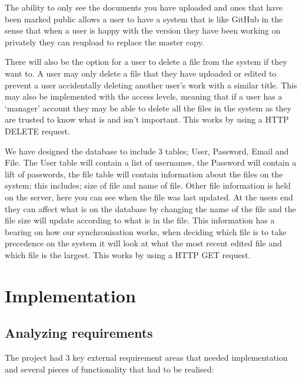 \documentclass[11pt]{article}
\begin{document}
The ability to only see the documents you have uploaded and ones that have been marked public allows a user to have a system that is like GitHub in the sense that when a user is happy with the version they have been working on privately they can reupload to replace the master copy. 

There will also be the option for a user to delete a file from the system if they want to. A user may only delete a file that they have uploaded or edited to prevent a user accidentally deleting another user’s work with a similar title. This may also be implemented with the access levels, meaning that if a user has a ‘manager’ account they may be able to delete all the files in the system as they are trusted to know what is and isn’t important. This works by using a HTTP DELETE request.

We have designed the database to include 3 tables; User, Password, Email and File. The User table will contain a list of usernames, the Password will contain a lift of passwords, the file table will contain information about the files on the system; this includes; size of file and name of file. Other file information is held on the server, here you can see when the file was last updated. At the users end they can affect what is on the database by changing the name of the file and the file size will update according to what is in the file. This information has a bearing on how our synchronisation works, when deciding which file is to take precedence on the system it will look at what the most recent edited file and which file is the largest. This works by using a HTTP GET  request.



\section{Implementation}

\subsection{Analyzing requirements}

The project had 3 key external requirement areas that needed implementation and several pieces of functionality that had to be realised:
\end{document}
